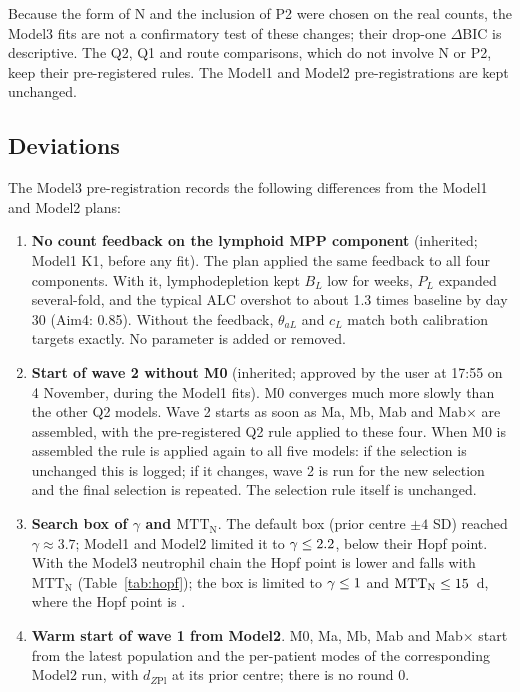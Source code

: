 \documentclass[11pt]{article}
\begin{document}
Because the form of N and the inclusion of P2 were chosen on the real counts, the Model3 fits are not a confirmatory test of these changes; their drop-one $\Delta$BIC is descriptive. The Q2, Q1 and route comparisons, which do not involve N or P2, keep their pre-registered rules. The Model1 and Model2 pre-registrations are kept unchanged.

\subsection{Deviations}\label{sec:deviations}
The Model3 pre-registration records the following differences from the Model1 and Model2 plans:
\begin{enumerate}
\item \textbf{No count feedback on the lymphoid MPP component} (inherited; Model1 K1, before any fit). The plan applied the same feedback to all four components. With it, lymphodepletion kept $B_L$ low for weeks, $P_L$ expanded several-fold, and the typical ALC overshot to about 1.3 times baseline by day 30 (Aim4: 0.85). Without the feedback, $\theta_{aL}$ and $c_L$ match both calibration targets exactly. No parameter is added or removed.
\item \textbf{Start of wave 2 without M0} (inherited; approved by the user at 17:55 on 4 November, during the Model1 fits). M0 converges much more slowly than the other Q2 models. Wave 2 starts as soon as Ma, Mb, Mab and Mab$\times$ are assembled, with the pre-registered Q2 rule applied to these four. When M0 is assembled the rule is applied again to all five models: if the selection is unchanged this is logged; if it changes, wave 2 is run for the new selection and the final selection is repeated. The selection rule itself is unchanged.
\item \textbf{Search box of $\gamma$ and $\mathrm{MTT}_{\mathrm{N}}$}. The default box (prior centre $\pm4$ SD) reached $\gamma\approx3.7$; Model1 and Model2 limited it to $\gamma\leq2.2$, below their Hopf point. With the Model3 neutrophil chain the Hopf point is lower and falls with $\mathrm{MTT}_{\mathrm{N}}$ (Table~\ref{tab:hopf}); the box is limited to $\gamma\leq1$ and $\mathrm{MTT}_{\mathrm{N}}\leq15$~d, where the Hopf point is \valHopfMttHi.
\item \textbf{Warm start of wave 1 from Model2}. M0, Ma, Mb, Mab and Mab$\times$ start from the latest population and the per-patient modes of the corresponding Model2 run, with $d_{Z\mathrm{Pl}}$ at its prior centre; there is no round 0.

\end{enumerate}
\end{document}

